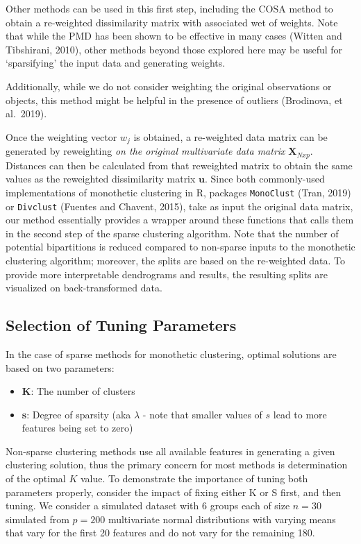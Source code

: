 \documentclass[
]{article}
\begin{document}
Other methods can be used in this first step, including the COSA method
to obtain a re-weighted dissimilarity matrix with associated wet of
weights. Note that while the PMD has been shown to be effective in many
cases (Witten and Tibshirani, 2010), other methods beyond those explored
here may be useful for `sparsifying' the input data and generating
weights.

Additionally, while we do not consider weighting the original
observations or objects, this method might be helpful in the presence of
outliers (Brodinova, et al.~2019).

Once the weighting vector \(w_j\) is obtained, a re-weighted data matrix
can be generated by reweighting
\textit{on the original multivariate data matrix} \(\textbf{X}_{Nxp}\).
Distances can then be calculated from that reweighted matrix to obtain
the same values as the reweighted dissimilarity matrix
\(\boldsymbol{u}\). Since both commonly-used implementations of
monothetic clustering in R, packages \texttt{MonoClust} (Tran, 2019) or
\texttt{Divclust} (Fuentes and Chavent, 2015), take as input the
original data matrix, our method essentially provides a wrapper around
these functions that calls them in the second step of the sparse
clustering algorithm. Note that the number of potential bipartitions is
reduced compared to non-sparse inputs to the monothetic clustering
algorithm; moreover, the splits are based on the re-weighted data. To
provide more interpretable dendrograms and results, the resulting splits
are visualized on back-transformed data.

\hypertarget{selection-of-tuning-parameters}{%
\subsection{Selection of Tuning
Parameters}\label{selection-of-tuning-parameters}}

In the case of sparse methods for monothetic clustering, optimal
solutions are based on two parameters:

\begin{itemize}
\item \textbf{K}: The number of clusters
\item \textbf{s}: Degree of sparsity (aka $\lambda$ - note that smaller values of $s$ lead to more features being set to zero)
\end{itemize}

Non-sparse clustering methods use all available features in generating a
given clustering solution, thus the primary concern for most methods is
determination of the optimal \(K\) value. To demonstrate the importance
of tuning both parameters properly, consider the impact of fixing either
K or S first, and then tuning. We consider a simulated dataset with 6
groups each of size \(n = 30\) simulated from \(p = 200\) multivariate
normal distributions with varying means that vary for the first 20
features and do not vary for the remaining 180.
\end{document}
